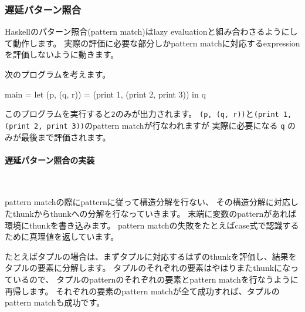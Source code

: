 \documentclass[mingoth,a4paper]{jsarticle}
\begin{document}
\subsubsection{遅延パターン照合}

Haskellのパターン照合(pattern match)はlazy evaluationと組み合わさるようにして動作します。
実際の評価に必要な部分しかpattern matchに対応するexpressionを評価しないように動きます。

次のプログラムを考えます。

\begin{commandline}
main = let { (p, (q, r)) = (print 1, (print 2, print 3)) } in
       q
\end{commandline}

このプログラムを実行すると\verb|2|のみが出力されます。
\verb|(p, (q, r))|と\verb|(print 1, (print 2, print 3))|のpattern matchが行なわれますが
実際に必要になる \verb|q| のみが最後まで評価されます。

\pagebreak

\paragraph{遅延パターン照合の実装} \ 

pattern matchの際にpatternに従って構造分解を行ない、
その構造分解に対応したthunkからthunkへの分解を行なっていきます。
末端に変数のpatternがあれば環境にthunkを書き込みます。
pattern matchの失敗をたとえばcase式で認識するために真理値を返しています。

たとえばタプルの場合は、まずタプルに対応するはずのthunkを評価し、結果をタプルの要素に分解します。
タプルのそれぞれの要素はやはりまたthunkになっているので、
タプルのpatternのそれぞれの要素とpattern matchを行なうように再帰します。
それぞれの要素のpattern matchが全て成功すれば、タプルのpattern matchも成功です。
\end{document}
